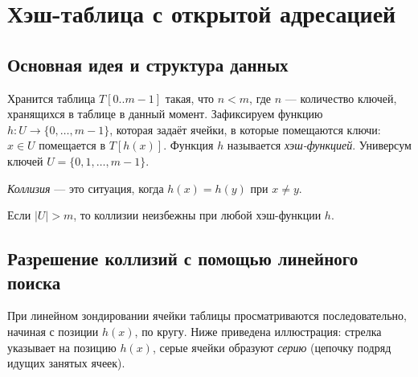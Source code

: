 
\section{Хэш-таблица с открытой адресацией}

\subsection{Основная идея и структура данных}

\begin{Definition}{}{}
	Хранится таблица $T[0..m-1]$ такая, что $n < m$, где $n$ — количество ключей, хранящихся в таблице в данный момент. Зафиксируем функцию $h\colon U \to \{0, \ldots, m-1\}$, которая задаёт ячейки, в которые помещаются ключи: $x \in U$ помещается в $T[h(x)]$. Функция $h$ называется \emph{хэш-функцией}. Универсум ключей $U = \{0, 1, \ldots, m-1\}$.
\end{Definition}

\begin{Definition}{}{}
	\emph{Коллизия} — это ситуация, когда $h(x) = h(y)$ при $x \neq y$.
\end{Definition}

\begin{Statement}{}{}
	Если $|U| > m$, то коллизии неизбежны при любой хэш-функции $h$.
\end{Statement}

\subsection{Разрешение коллизий с помощью линейного поиска}

При линейном зондировании ячейки таблицы просматриваются последовательно, начиная с позиции $h(x)$, по кругу. Ниже приведена иллюстрация: стрелка указывает на позицию $h(x)$, серые ячейки образуют \emph{серию} (цепочку подряд идущих занятых ячеек).

